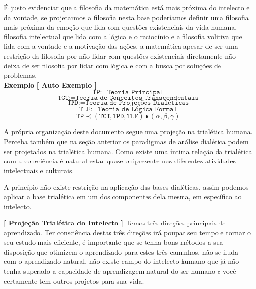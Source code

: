 \documentclass[10pt,a4paper]{report}
\begin{document}
É justo evidenciar que a filosofia da matemática está mais próxima do intelecto e da vontade, se projetarmos a filosofia nesta base poderíamos definir uma filosofia mais próxima da emoção que lida com questões existenciais da vida humana, filosofia intelectual que lida com a lógica e o raciocínio e a filosofia volitiva que lida com a vontade e a motivação das ações, a matemática apesar de ser uma restrição da filosofia por não lidar com questões existenciais diretamente não deixa de ser filosofia por lidar com lógica e com a busca por soluções de problemas. \\

\textbf{Exemplo [ Auto Exemplo ]}
$$ \texttt{TP} := \texttt{Teoria Principal} $$
$$ \texttt{TCT} := \texttt{Teoria de Conceitos Transcendentais} $$
$$ \texttt{TPD} := \texttt{Teoria de Projeções Dialéticas} $$
$$ \texttt{TLF} := \texttt{Teoria de Lógica Formal} $$
$$ \texttt{TP} \prec ( \texttt{TCT} ,  \texttt{TPD} , \texttt{TLF} ) \bullet (\alpha, \beta, \gamma) $$

\hspace{\baselineskip}

A própria organização deste documento segue uma projeção na trialética humana. Perceba também que na seção anterior os paradigmas de análise dialética podem ser projetados na trialética humana. Como existe uma íntima relação da trialética com a consciência é natural estar quase onipresente nas diferentes atividades intelectuais e culturais.

\hspace{\baselineskip}

A princípio não existe restrição na aplicação das bases dialéticas, assim podemos aplicar a base trialética em um dos componentes dela mesma, em específico ao intelecto.

\hspace{\baselineskip}

\textbf{[ Projeção Trialética do Intelecto ]} Temos três direções principais de aprendizado. Ter consciência destas três direções irá poupar seu tempo e tornar o seu estudo mais eficiente, é importante que se tenha bons métodos a sua disposição que otimizem o aprendizado para estes três caminhos, não se iluda com o aprendizado natural, não existe campo do intelecto humano que já não tenha superado a capacidade de aprendizagem natural do ser humano e você certamente tem outros projetos para sua vida.
\end{document}
